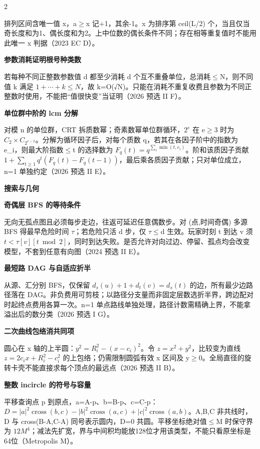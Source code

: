 \documentclass[UTF8,fontset=fandol,a4paper,twoside]{ctexart}
\newcommand{\topic}[1]{\par\smallskip\textbf{#1}\par\nobreak}
\newcommand{\note}[1]{{\fontsize{10}{12}\selectfont #1\par}}
\begin{document}
\begin{multicols}{2}
\note{排列区间含唯一值 x，a\ensuremath{\ge}x 记+\allowbreak{}1，其余-\allowbreak{}1。x 为排序第 ceil(\allowbreak{}L/\allowbreak{}2)\allowbreak{} 个，当且仅当奇长度和为1、偶长度和为2。上中位数的偶长条件不同；存在相等重复值时不能用此唯一 x 判据（2023 EC D）。}
\par\textbf{参数消耗证明根号种类数}\quad
\note{若每种不同正整数参数值 d 都至少消耗 d 个互不重叠单位，总消耗\ensuremath{\le}N，则不同值 k 满足 $1+\cdots+k\le N$，故 k=\allowbreak{}O(\allowbreak{}√N)\allowbreak{}。只能在消耗不重复收费且参数为不同正整数时使用，不能把“值很快变”当证明（2026 预选 II F）。}
\par\textbf{单位群中阶的 lcm 分解}\quad
\note{对模 n 的单位群，CRT 拆质数幂；奇素数幂单位群循环，$2^e$ 在 e\ensuremath{\ge}3 时为 $C_2\times C_{2^{e-2}}$。分解为循环因子后，对每个质数 q，若其在各因子阶中的指数为 e\_i，则最大阶指数\ensuremath{\le}t 的选择数为 $F_q(t)=q^{\sum_i\min(t,e_i)}$。阶和该质因子贡献 $1+\sum_{t\ge1}q^t(F_q(t)-F_q(t-1))$，最后乘各质因子贡献；只对单位成立，n=\allowbreak{}1 单独约定（2026 预选 II E）。}
\topic{搜索与几何}
\par\textbf{奇偶层 BFS 的等待条件}\quad
\note{无向无孤点图且必须每步走边，往返可延迟任意偶数步。对 (\allowbreak{}点,\allowbreak{}时间奇偶)\allowbreak{} 多源 BFS 得最早危险时间 \ensuremath{\tau}；若危险只活 d 步，仅 \ensuremath{\tau}\ensuremath{\le}d 生效。玩家时刻 t 到达 v 须 $t<\tau[v][t\bmod2]$，同时到达失败。是否允许对向过边、停留、孤点均会改变模型，不套到任意有向图（2024 预选 II E）。}
\par\textbf{最短路 DAG 与自适应折半}\quad
\note{从源、汇分别 BFS，仅保留 $d_s(u)+1+d_t(v)=d_s(t)$ 的边，所有最少边路径落在 DAG。非负费用可剪枝；以路径分支量而非固定层数选折半界，跨边配对时起终点费用各算一次。n=\allowbreak{}1 单点路线单独处理，路径计数需精确上界，不能拿溢出后的数分类（2026 预选 I G）。}
\par\textbf{二次曲线包络消共同项}\quad
\note{圆心在 x 轴的上半圆：$y^2=R_i^2-(x-c_i)^2$。令 $z=x^2+y^2$，比较变为直线 $z=2c_i x+R_i^2-c_i^2$ 的上包络；仍需限制圆弧有效 x 区间及 y\ensuremath{\ge}0。全局直径的旋转卡壳不能直接求每个顶点的最远点（2026 预选 II B）。}
\par\textbf{整数 incircle 的符号与容量}\quad
\note{平移查询点 p 到原点，a=\allowbreak{}A-\allowbreak{}p、b=\allowbreak{}B-\allowbreak{}p、c=\allowbreak{}C-\allowbreak{}p：$D=|a|^2\operatorname{cross}(b,c)-|b|^2\operatorname{cross}(a,c)+|c|^2\operatorname{cross}(a,b)$。A,\allowbreak{}B,\allowbreak{}C 非共线时，D 与 cross(\allowbreak{}B-\allowbreak{}A,\allowbreak{}C-\allowbreak{}A)\allowbreak{} 同号表示圆内，D=\allowbreak{}0 共圆。平移坐标绝对值\ensuremath{\le}M 时保守界为 $12M^4$；减法先扩宽，界与中间积均能放128位才用该类型，不能只看原坐标是64位（Metropolis M）。}

\end{multicols}
\end{document}
